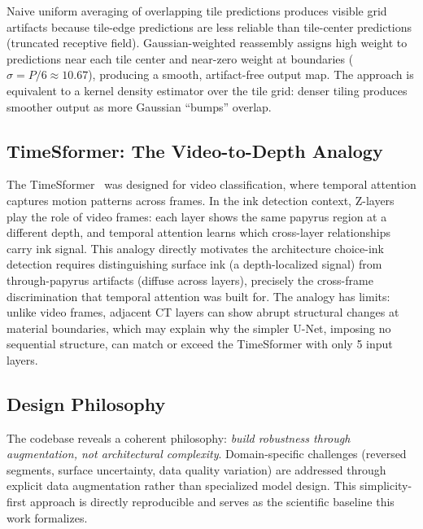 Naive uniform averaging of overlapping tile predictions produces visible grid artifacts because tile-edge predictions are less reliable than tile-center predictions (truncated receptive field). Gaussian-weighted reassembly assigns high weight to predictions near each tile center and near-zero weight at boundaries ($\sigma = P/6 \approx 10.67$), producing a smooth, artifact-free output map. The approach is equivalent to a kernel density estimator over the tile grid: denser tiling produces smoother output as more Gaussian ``bumps'' overlap.

\subsection{TimeSformer: The Video-to-Depth Analogy}

The TimeSformer~\cite{bertasius2021timesformer} was designed for video classification, where temporal attention captures motion patterns across frames. In the ink detection context, Z-layers play the role of video frames: each layer shows the same papyrus region at a different depth, and temporal attention learns which cross-layer relationships carry ink signal. This analogy directly motivates the architecture choice-ink detection requires distinguishing surface ink (a depth-localized signal) from through-papyrus artifacts (diffuse across layers), precisely the cross-frame discrimination that temporal attention was built for. The analogy has limits: unlike video frames, adjacent CT layers can show abrupt structural changes at material boundaries, which may explain why the simpler U-Net, imposing no sequential structure, can match or exceed the TimeSformer with only 5 input layers.

\subsection{Design Philosophy}

The codebase reveals a coherent philosophy: \emph{build robustness through augmentation, not architectural complexity}. Domain-specific challenges (reversed segments, surface uncertainty, data quality variation) are addressed through explicit data augmentation rather than specialized model design. This simplicity-first approach is directly reproducible and serves as the scientific baseline this work formalizes.

